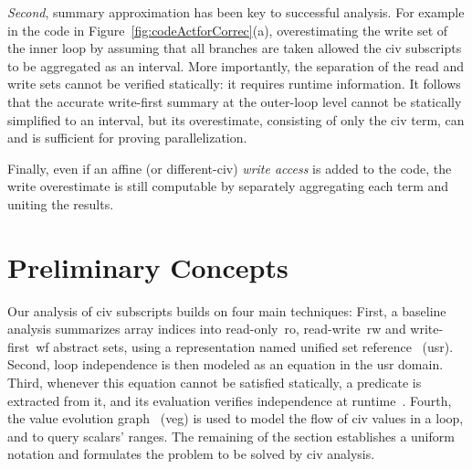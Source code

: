 \documentclass{sig-alternate}
\begin{document}
{\em Second}, summary approximation has been key to successful
analysis. For example in the code in Figure~\ref{fig:codeActforCorrec}(a), 
overestimating the write set of the inner loop by assuming that all 
branches are taken allowed the {\sc civ} subscripts to be aggregated
as an interval. 
More importantly, the separation of the read and write sets cannot 
be verified statically: it requires runtime information. 
%
It follows that the accurate write-first summary at the 
outer-loop level cannot be statically simplified to an interval,
but its overestimate, consisting of only the {\sc civ} term, 
can and is sufficient for proving parallelization.

Finally, even if an affine (or different-{\sc civ})
{\em write access} is added to the code, the write overestimate
is still computable by separately aggregating each term and 
uniting the results.


\section{Preliminary Concepts}
\label{subsec:Background}


Our analysis of {\sc civ} subscripts builds on four main techniques: 
%
First, a baseline analysis summarizes array indices into read-only~{\sc ro}, 
read-write~{\sc rw} and write-first~{\sc wf} abstract sets, using a 
representation named unified set reference~\cite{HybAn} ({\sc usr}).
%
Second, loop independence is then modeled as an equation in the 
{\sc usr} domain. 
%
Third, whenever this equation cannot be satisfied statically, a 
predicate is extracted from it, and its evaluation verifies independence 
at runtime~\cite{CosPLDI}. 
%
Fourth, the value evolution graph~\cite{VEG} ({\sc veg}) is 
used to model the flow of {\sc civ} values in a loop, and to 
query scalars' ranges.
The remaining of the section establishes a uniform notation and 
formulates the problem to be solved by {\sc civ} analysis. 
\end{document}
